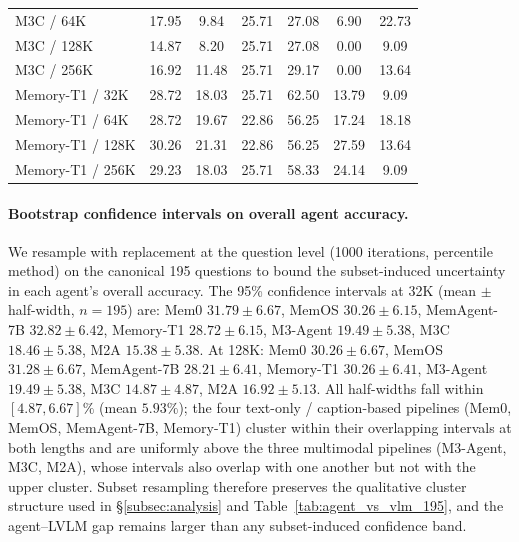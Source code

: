\documentclass{article}
\begin{document}
\begin{table}[h]
\begin{tabular}{@{}lcccccc@{}}
M3C / 64K                 & 17.95 &  9.84 & 25.71 & 27.08 &  6.90 & 22.73 \\
M3C / 128K                & 14.87 &  8.20 & 25.71 & 27.08 &  0.00 &  9.09 \\
M3C / 256K                & 16.92 & 11.48 & 25.71 & 29.17 &  0.00 & 13.64 \\
Memory-T1 / 32K           & 28.72 & 18.03 & 25.71 & 62.50 & 13.79 &  9.09 \\
Memory-T1 / 64K           & 28.72 & 19.67 & 22.86 & 56.25 & 17.24 & 18.18 \\
Memory-T1 / 128K          & 30.26 & 21.31 & 22.86 & 56.25 & 27.59 & 13.64 \\
Memory-T1 / 256K          & 29.23 & 18.03 & 25.71 & 58.33 & 24.14 &  9.09 \\
\bottomrule
\end{tabular}
\end{table}

\paragraph{Bootstrap confidence intervals on overall agent accuracy.}
We resample with replacement at the question level (1000 iterations, percentile method) on the canonical 195 questions to bound the subset-induced uncertainty in each agent's overall accuracy. The 95\% confidence intervals at 32K (mean $\pm$ half-width, $n=195$) are: Mem0 $31.79 \pm 6.67$, MemOS $30.26 \pm 6.15$, MemAgent-7B $32.82 \pm 6.42$, Memory-T1 $28.72 \pm 6.15$, M3-Agent $19.49 \pm 5.38$, M3C $18.46 \pm 5.38$, M2A $15.38 \pm 5.38$. At 128K: Mem0 $30.26 \pm 6.67$, MemOS $31.28 \pm 6.67$, MemAgent-7B $28.21 \pm 6.41$, Memory-T1 $30.26 \pm 6.41$, M3-Agent $19.49 \pm 5.38$, M3C $14.87 \pm 4.87$, M2A $16.92 \pm 5.13$. All half-widths fall within $[4.87, 6.67]\%$ (mean $5.93\%$); the four text-only / caption-based pipelines (Mem0, MemOS, MemAgent-7B, Memory-T1) cluster within their overlapping intervals at both lengths and are uniformly above the three multimodal pipelines (M3-Agent, M3C, M2A), whose intervals also overlap with one another but not with the upper cluster. Subset resampling therefore preserves the qualitative cluster structure used in \S\ref{subsec:analysis} and Table~\ref{tab:agent_vs_vlm_195}, and the agent--LVLM gap remains larger than any subset-induced confidence band.
\end{document}
